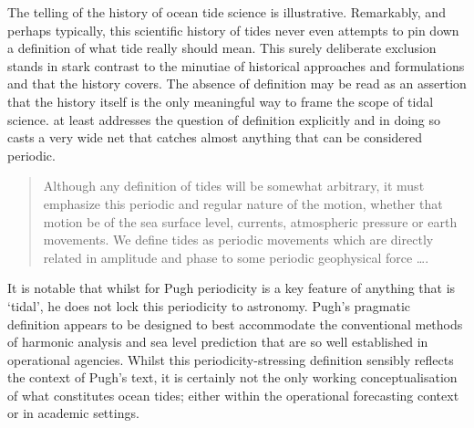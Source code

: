 The \citep{Cartwright:2000tt} telling of the history of ocean tide science is illustrative. Remarkably, and perhaps typically, this scientific history of tides never even attempts to pin down a definition of what tide really should mean.  This surely deliberate exclusion stands in stark contrast to the minutiae of historical approaches and formulations and that the history covers.  The absence of definition may be read as an assertion that the history itself is the only meaningful way to frame the scope of tidal science.
\citep{Pugh:1996uz} at least addresses the question of definition explicitly and in doing so casts a very wide net that catches almost anything that can be considered periodic.
\begin{quote}
Although any definition of tides will be somewhat arbitrary, it must emphasize this periodic and regular nature of the motion, whether that motion be of the sea surface level, currents, atmospheric pressure or earth movements. We define tides as periodic movements which are directly related in amplitude and phase to some periodic geophysical force \ldots.
\end{quote}
It is notable that whilst for Pugh periodicity is a key feature of anything that is `tidal', he does not lock this periodicity to astronomy.  Pugh's pragmatic definition appears to be designed to best accommodate the conventional methods of harmonic analysis and sea level prediction that are so well established in operational agencies. Whilst this periodicity-stressing definition sensibly reflects the context of Pugh's text, it is certainly not the only working conceptualisation of what constitutes ocean tides; either within the operational forecasting context or in academic settings. 

